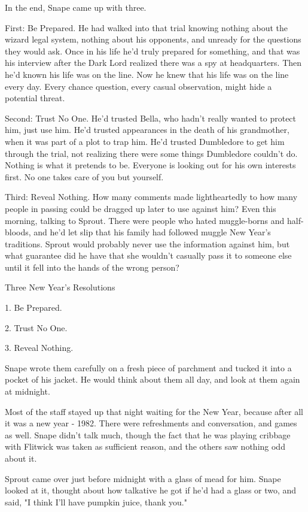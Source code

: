 \documentclass[a4paper,11pt]{article}
\begin{document}
In the end, Snape came up with three.

First: Be Prepared. He had walked into that trial knowing nothing about the wizard legal system, nothing about his opponents, and unready for the questions they would ask. Once in his life he'd truly prepared for something, and that was his interview after the Dark Lord realized there was a spy at headquarters. Then he'd known his life was on the line. Now he knew that his life was on the line every day. Every chance question, every casual observation, might hide a potential threat.

Second: Trust No One. He'd trusted Bella, who hadn't really wanted to protect him, just use him. He'd trusted appearances in the death of his grandmother, when it was part of a plot to trap him. He'd trusted Dumbledore to get him through the trial, not realizing there were some things Dumbledore couldn't do. Nothing is what it pretends to be. Everyone is looking out for his own interests first. No one takes care of you but yourself.

Third: Reveal Nothing. How many comments made lightheartedly to how many people in passing could be dragged up later to use against him? Even this morning, talking to Sprout. There were people who hated muggle-borns and half-bloods, and he'd let slip that his family had followed muggle New Year's traditions. Sprout would probably never use the information against him, but what guarantee did he have that she wouldn't casually pass it to someone else until it fell into the hands of the wrong person?

Three New Year's Resolutions

1. Be Prepared.

2. Trust No One.

3. Reveal Nothing.

Snape wrote them carefully on a fresh piece of parchment and tucked it into a pocket of his jacket. He would think about them all day, and look at them again at midnight.

Most of the staff stayed up that night waiting for the New Year, because after all it was a new year - 1982. There were refreshments and conversation, and games as well. Snape didn't talk much, though the fact that he was playing cribbage with Flitwick was taken as sufficient reason, and the others saw nothing odd about it.

Sprout came over just before midnight with a glass of mead for him. Snape looked at it, thought about how talkative he got if he'd had a glass or two, and said, "I think I'll have pumpkin juice, thank you."
\end{document}
